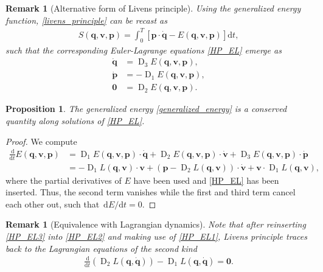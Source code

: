 \documentclass{multibody2023_full_paper}
\newtheorem{remark}[theorem]{Remark}
\newtheorem{proposition}[theorem]{Proposition}
\newcommand{\dt}{\mathrm{d}t}
\renewcommand{\d}[1][]{\ensuremath{\,\mathrm{d}#1}}
\DeclareMathOperator{\D}{D}
\renewcommand{\vec}[1]{\ensuremath{\mbox{$\mathbf{#1}$}}}
\begin{document}
\begin{remark}[Alternative form of Livens principle]
    Using the generalized energy function, \eqref{livens_principle} can be recast as
    \begin{align}
        S(\vec{q},\vec{v},\vec{p}) = \int_0^T \left[ \vec{p} \cdot \dot{\vec{q}} - E(\vec{q},\vec{v},\vec{p}) \right] \dt ,
    \end{align}
    such that the corresponding Euler-Lagrange equations \eqref{HP_EL} emerge as
    \begin{subequations}
        \label{HP_EL_new}
        \begin{align}
            \dot{\vec{q}} & = \D_3 E(\vec{q},\vec{v},\vec{p}) ,  \\
            \dot{\vec{p}} & = -\D_1 E(\vec{q},\vec{v},\vec{p}) , \\
            \vec{0}       & = \D_2 E(\vec{q},\vec{v},\vec{p}) .
        \end{align}
    \end{subequations}
\end{remark}

\begin{proposition}
    The generalized energy \eqref{generalized_energy} is a conserved quantity along solutions of \eqref{HP_EL}.
\end{proposition}

\begin{proof}
    We compute
    \begin{align}
        \frac{\d}{\dt}E(\vec{q},\vec{v},\vec{p}) & = \D_1 E(\vec{q},\vec{v},\vec{p}) \cdot \dot{\vec{q}} + \D_2 E(\vec{q},\vec{v},\vec{p}) \cdot \dot{\vec{v}} + \D_3 E(\vec{q},\vec{v},\vec{p}) \cdot \dot{\vec{p}} \\
                                                 & = -\D_1 L(\vec{q},\vec{v}) \cdot \vec{v} + (\vec{p} - \D_2 L(\vec{q},\vec{v})) \cdot \dot{\vec{v}} + \vec{v} \cdot \D_1 L(\vec{q},\vec{v}) ,
    \end{align}
    where the partial derivatives of $E$ have been used and \eqref{HP_EL} has been inserted. Thus, the second term vanishes while the first and third term cancel each other out, such that $\d E / \dt = 0$.
\end{proof}

\begin{remark}[Equivalence with Lagrangian dynamics]
    Note that after reinserting \eqref{HP_EL3} into \eqref{HP_EL2} and making use of \eqref{HP_EL1}, Livens principle traces back to the Lagrangian equations of the second kind
    \begin{align}
        \frac{\d}{\dt} \left( \D_2 L(\vec{q},\dot{\vec{q}}) \right) - \D_1 L(\vec{q},\dot{\vec{q}}) = \vec{0} .
    \end{align}
\end{remark}
\end{document}
